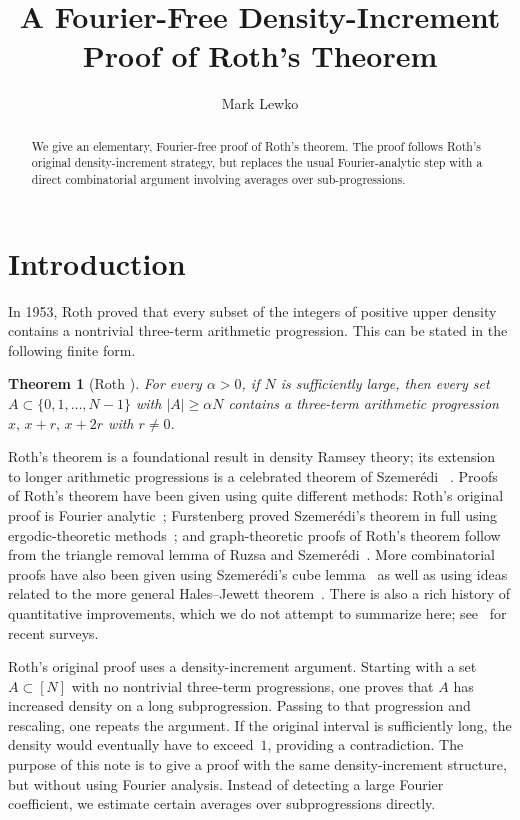 \documentclass[11pt]{amsart}
\title{A Fourier-Free Density-Increment Proof of Roth's Theorem}
\author{Mark Lewko}
\date{}
\newcommand{\abs}[1]{\lvert#1\rvert}
\numberwithin{equation}{section}
\theoremstyle{plain}
\newtheorem{theorem}{Theorem}
\theoremstyle{remark}
\begin{document}
\begin{abstract}
We give an elementary, Fourier-free proof of Roth's theorem. The proof
follows Roth's original density-increment strategy, but replaces the usual
Fourier-analytic step with a direct combinatorial argument involving averages
over sub-progressions.
\end{abstract}

\maketitle

\section{Introduction}

In 1953, Roth proved that every subset of the integers of positive upper density
contains a nontrivial three-term arithmetic progression. This can be stated in
the following finite form.

\begin{theorem}[Roth \cite{Roth53}]\label{thm:roth}
For every $\alpha>0$, if $N$ is sufficiently large, then every set
$A\subset\{0,1,\ldots,N-1\}$ with $\abs{A}\geq\alpha N$ contains a
three-term arithmetic progression $x,\,x+r,\,x+2r$ with $r\neq 0$.
\end{theorem}

Roth's theorem is a foundational result in density Ramsey theory; its extension
to longer arithmetic progressions is a celebrated theorem of Szemer\'edi ~\cite{Szemeredi75}.
Proofs of Roth's theorem have been given using quite different methods: Roth's original
proof is Fourier analytic~\cite{Roth53}; Furstenberg proved Szemer\'edi's
theorem in full using ergodic-theoretic methods~\cite{Furstenberg77}; and graph-theoretic
proofs of Roth's theorem follow from the triangle removal lemma of Ruzsa and
Szemer\'edi~\cite{RS78}. More combinatorial proofs have also been given using Szemer\'edi's cube
lemma~\cite{GRS} as well as using ideas related to the more general Hales--Jewett theorem~\cite{DHJ}. There is
also a rich history of quantitative improvements, which we do not attempt to
summarize here; see~\cite{Green,P} for recent surveys.

Roth's original proof uses a density-increment argument. Starting with a set
$A\subset[N]$ with no nontrivial three-term progressions, one proves that $A$
has increased density on a long subprogression. Passing to that progression
and rescaling, one repeats the argument. If the original interval is sufficiently
long, the density would eventually have to exceed~$1$, providing a contradiction.
The purpose of this note is to give a proof with the same density-increment
structure, but without using Fourier analysis. Instead of detecting a large
Fourier coefficient, we estimate certain averages over subprogressions directly.
\end{document}
